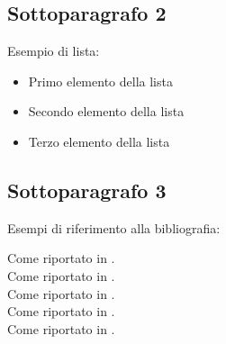 \subsection{Sottoparagrafo 2}\label{Sottoparagrafo 2}

Esempio di lista:

\begin{itemize}[noitemsep]
    \item Primo elemento della lista
    \item Secondo elemento della lista
    \item Terzo elemento della lista
\end{itemize}


\subsection{Sottoparagrafo 3}\label{Sottoparagrafo 3}
Esempi di riferimento alla bibliografia:

Come riportato in \cite{6223430}.\\
Come riportato in \cite{adamgeitgey}.\\
Come riportato in \cite{Kazemi_2014_CVPR}.\\
Come riportato in \cite{Schroff_2015_CVPR}.\\
Come riportato in \cite{SourceAFIS}.
